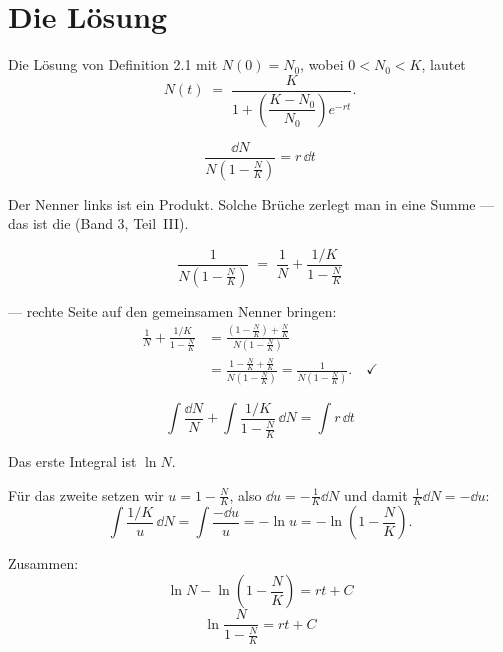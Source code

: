\section{Die Lösung}

\begin{merksatz}
Die Lösung von Definition 2.1 mit $N(0) = N_0$, wobei $0 < N_0 < K$, lautet
\[ N(t) \;=\; \frac{K}{1 + \left(\dfrac{K-N_0}{N_0}\right)e^{-rt}} . \]
\end{merksatz}

\begin{merksatz}
\[ \frac{\dd N}{N\left(1-\frac{N}{K}\right)} = r\,\dd t \]

Der Nenner links ist ein Produkt. Solche Brüche zerlegt man in eine Summe --- das ist die  (Band 3, Teil~III).

\[ \frac{1}{N\left(1-\frac{N}{K}\right)} \;=\; \frac{1}{N} + \frac{1/K}{1-\frac{N}{K}} \]

 --- rechte Seite auf den gemeinsamen Nenner bringen:
\begin{align*}
\frac{1}{N} + \frac{1/K}{1-\frac{N}{K}} &= \frac{\left(1-\frac{N}{K}\right) + \frac{N}{K}}{N\left(1-\frac{N}{K}\right)}\\
&= \frac{1 - \frac{N}{K} + \frac{N}{K}}{N\left(1-\frac{N}{K}\right)} = \frac{1}{N\left(1-\frac{N}{K}\right)} . \quad \checkmark
\end{align*}

\[ \int\frac{\dd N}{N} + \int\frac{1/K}{1-\frac{N}{K}}\,\dd N = \int r\,\dd t \]

Das erste Integral ist $\ln N$.

Für das zweite setzen wir $u = 1 - \frac{N}{K}$, also $\dd u = -\frac{1}{K}\dd N$ und damit $\frac{1}{K}\dd N = -\dd u$:
\[ \int\frac{1/K}{u}\,\dd N = \int \frac{-\dd u}{u} = -\ln u = -\ln\left(1-\frac{N}{K}\right) . \]

Zusammen:
\[ \ln N - \ln\left(1-\frac{N}{K}\right) = rt + C \]
\[ \ln\frac{N}{1-\frac{N}{K}} = rt + C \]
\end{merksatz}

